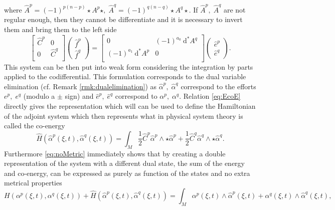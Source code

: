 \documentclass{elsarticle}
\renewcommand\d{\ensuremath{\mathrm{d}}}
\newcommand*{\dual}[1]{\ensuremath{\widehat{#1}}}
\begin{document}
where $\dual{A}^p = (-1)^{p(n-p)} \star A^p \star, \; \dual{A}^q = (-1)^{q(n-q)} \star A^q \star$. 
If $\dual{A}^p, \; \dual{A}^q$ are not regular enough, then they cannot be differentiate and it is necessary to invert them and bring them to the left side
\begin{equation}
\begin{bmatrix}
    \dual{C}^p & 0 \\
    0 & \dual{C}^q \\
\end{bmatrix}
    \begin{pmatrix}
     \dual{f}^{p} \\
     \dual{f}^{q} 
    \end{pmatrix} = 
    \begin{bmatrix}
        0 &  (-1)^{a_0}\
        \d^* A^q \\
        (-1)^{a_1}\  \d^* A^p & 0 \\
    \end{bmatrix}
    \begin{pmatrix}
        \dual{e}^{p}\\
        \dual{e}^{q}
    \end{pmatrix}.
\end{equation}
This system can be then put into weak form considering the integration by parts applied to the codifferential. This formulation corresponds to the dual variable elimination (cf. Remark \ref{rmk:dualelimination}) as $\dual{\alpha}^p, \; \dual{\alpha}^q$ correspond to the efforts ${e}^p, \; {e}^q$ (modulo a $\pm$ sign) and $\dual{e}^p, \; \dual{e}^q$ correspond to $\alpha^p, \; \alpha^q$. Relation \eqref{eq:EcoE}  directly gives the representation which will can be used to define the Hamiltonian of the adjoint system which then represents what in physical system theory is called the co-energy
\begin{equation}
\dual{H}(\dual{\alpha}^p(\xi, t), \dual{\alpha}^q(\xi, t))  = \int_M \frac{1}{2} \dual{C}^p \dual{\alpha}^p \wedge \star \dual{\alpha}^p + \frac{1}{2}  \dual{C}^q \dual{\alpha}^q \wedge \star  \dual{\alpha}^q.
\end{equation}
 Furthermore \eqref{eq:noMetric} immediately shows that by creating a double representation of the system with a different dual state,  the sum of the energy and co-energy, can be expressed as purely as function of the states and no extra metrical properties
\begin{equation}
   {H}({\alpha}^p(\xi, t), {\alpha}^q(\xi, t)) 
   +
   \dual{H}(\dual{\alpha}^p(\xi, t), \dual{\alpha}^q(\xi, t)) 
   = 
\int_M  
{\alpha}^p(\xi, t) \wedge 
\dual{\alpha}^p(\xi, t) 
+
{\alpha}^q(\xi, t)
\wedge
\dual{\alpha}^q(\xi, t),
\end{equation}
\end{document}
